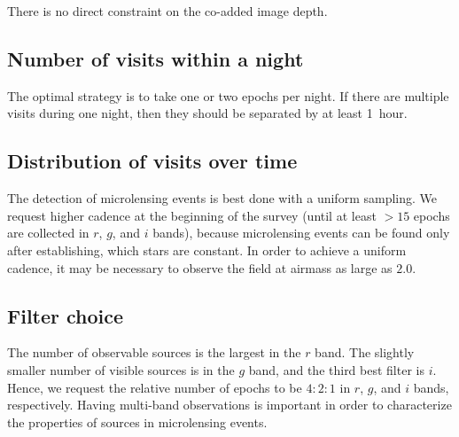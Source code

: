 \documentclass[12pt,letterpaper]{article}
\begin{document}
There is no direct constraint on the co-added image depth.


\subsection{Number of visits within a night}

The optimal strategy is to take one or two epochs per night.  
If there are multiple visits during one night, 
then they should be separated by at least 1~hour.


\subsection{Distribution of visits over time}

The detection of microlensing events is best done with a uniform sampling.  
We request higher cadence at the beginning of the survey 
(until at least $>15$ epochs are collected in $r$, $g$, and $i$ bands), 
because microlensing events can be found only after establishing, 
which stars are constant.  In order to achieve a uniform cadence, 
it may be necessary to observe the field at airmass as large as $2.0$.


\subsection{Filter choice}

The number of observable sources is the largest in the $r$ band.  
The slightly smaller number of visible sources is in the $g$ band, and 
the third best filter is $i$.  Hence, we request 
the relative number of epochs to be $4:2:1$ in $r$, $g$, and $i$ bands, respectively.  
Having multi-band observations is important in order to characterize 
the properties of sources in microlensing events. %
\end{document}

